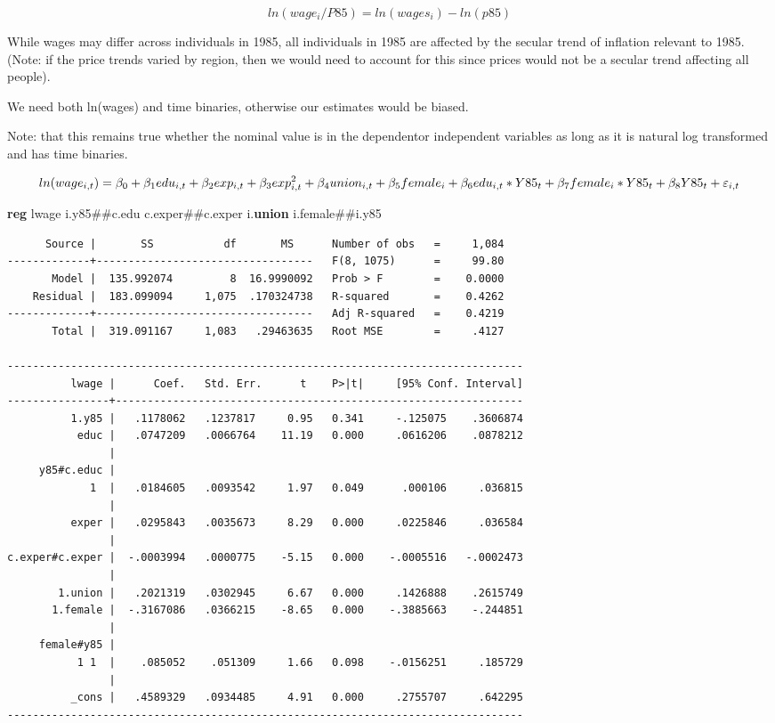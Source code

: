 \documentclass[
]{book}
\newenvironment{Shaded}{\begin{snugshade}}{\end{snugshade}}
\newcommand{\KeywordTok}[1]{\textcolor[rgb]{0.13,0.29,0.53}{\textbf{#1}}}
\newcommand{\NormalTok}[1]{#1}
\begin{document}
\[ ln(wage_i/P85)=ln(wages_i)-ln(p85) \]

While wages may differ across individuals in 1985, all individuals in 1985 are affected by the secular trend of inflation relevant to 1985. (Note: if the price trends varied by region, then we would need to account for this since prices would not be a secular trend affecting all people).

We need both ln(wages) and time binaries, otherwise our estimates would be biased.

Note: that this remains true whether the nominal value is in the dependentor independent variables as long as it is natural log transformed and has time binaries.

\[ ln(wage_{i,t}) = \beta_0 + \beta_1 edu_{i,t} + \beta_2 exp_{i,t} + \beta_3 exp^2_{i,t} + \beta_4 union_{i,t} + \beta_5 female_{i} + \\ \beta_6 edu_{i,t}*Y85_t + \beta_7 female_i*Y85_{t} +\beta_8 Y85_{t} + \varepsilon_{i,t} \]

\begin{Shaded}
\begin{Highlighting}[]
\KeywordTok{reg}\NormalTok{ lwage i.y85\#\#c.edu c.exper\#\#c.exper i.}\KeywordTok{union}\NormalTok{ i.female\#\#i.y85}
\end{Highlighting}
\end{Shaded}

\begin{verbatim}
      Source |       SS           df       MS      Number of obs   =     1,084
-------------+----------------------------------   F(8, 1075)      =     99.80
       Model |  135.992074         8  16.9990092   Prob > F        =    0.0000
    Residual |  183.099094     1,075  .170324738   R-squared       =    0.4262
-------------+----------------------------------   Adj R-squared   =    0.4219
       Total |  319.091167     1,083   .29463635   Root MSE        =     .4127

---------------------------------------------------------------------------------
          lwage |      Coef.   Std. Err.      t    P>|t|     [95% Conf. Interval]
----------------+----------------------------------------------------------------
          1.y85 |   .1178062   .1237817     0.95   0.341     -.125075    .3606874
           educ |   .0747209   .0066764    11.19   0.000     .0616206    .0878212
                |
     y85#c.educ |
             1  |   .0184605   .0093542     1.97   0.049      .000106     .036815
                |
          exper |   .0295843   .0035673     8.29   0.000     .0225846     .036584
                |
c.exper#c.exper |  -.0003994   .0000775    -5.15   0.000    -.0005516   -.0002473
                |
        1.union |   .2021319   .0302945     6.67   0.000     .1426888    .2615749
       1.female |  -.3167086   .0366215    -8.65   0.000    -.3885663    -.244851
                |
     female#y85 |
           1 1  |    .085052    .051309     1.66   0.098    -.0156251     .185729
                |
          _cons |   .4589329   .0934485     4.91   0.000     .2755707     .642295
---------------------------------------------------------------------------------
\end{verbatim}
\end{document}
